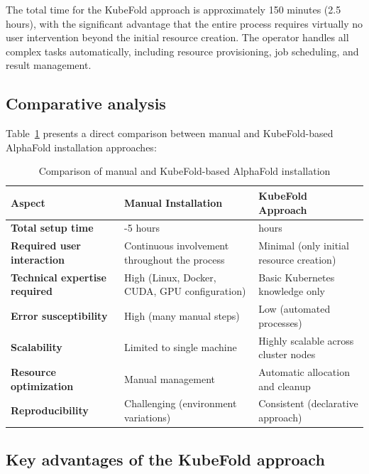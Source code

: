 The total time for the KubeFold approach is approximately 150 minutes (2.5 hours), with the significant advantage that the entire process requires virtually no user intervention beyond the initial resource creation. The operator handles all complex tasks automatically, including resource provisioning, job scheduling, and result management.

\subsection{Comparative analysis}

Table~\ref{tab:installation_comparison} presents a direct comparison between manual and KubeFold-based AlphaFold installation approaches:

\begin{table}[H]
    \centering
    \caption{Comparison of manual and KubeFold-based AlphaFold installation}
    \label{tab:installation_comparison}
    \small
    \begin{tabularx}{\textwidth}{|>{\centering\arraybackslash}X|>{\centering\arraybackslash}X|>{\centering\arraybackslash}X|}
        \hline
        \textbf{Aspect} & \textbf{Manual Installation} & \textbf{KubeFold Approach} \\
        \hline
        \textbf{Total setup time} & 3-5 hours & 2.5 hours \\
        \hline
        \textbf{Required user interaction} & Continuous involvement throughout the process & Minimal (only initial resource creation) \\
        \hline
        \textbf{Technical expertise required} & High (Linux, Docker, CUDA, GPU configuration) & Basic Kubernetes knowledge only \\
        \hline
        \textbf{Error susceptibility} & High (many manual steps) & Low (automated processes) \\
        \hline
        \textbf{Scalability} & Limited to single machine & Highly scalable across cluster nodes \\
        \hline
        \textbf{Resource optimization} & Manual management & Automatic allocation and cleanup \\
        \hline
        \textbf{Reproducibility} & Challenging (environment variations) & Consistent (declarative approach) \\
        \hline
    \end{tabularx}
\end{table}

\subsection{Key advantages of the KubeFold approach}

